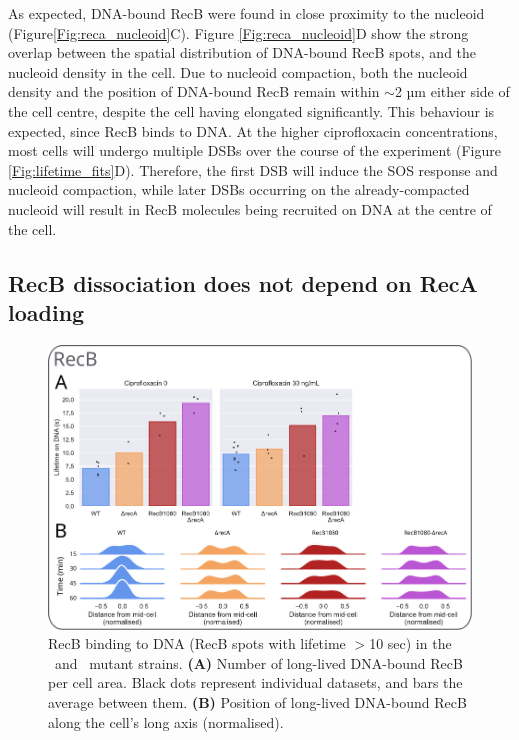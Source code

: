 As expected, DNA-bound RecB were found in close proximity to the nucleoid (Figure\ref{Fig:reca_nucleoid}C). Figure \ref{Fig:reca_nucleoid}D show the strong overlap between the spatial distribution of DNA-bound RecB spots, and the nucleoid density in the cell. Due to nucleoid compaction, both the nucleoid density and the position of DNA-bound RecB remain within $\sim$2 µm either side of the cell centre, despite the cell having elongated significantly. This behaviour is expected, since RecB binds to DNA. At the higher ciprofloxacin concentrations, most cells will undergo multiple DSBs over the course of the experiment (Figure \ref{Fig:lifetime_fits}D). Therefore, the first DSB will induce the SOS response and nucleoid compaction, while later DSBs occurring on the already-compacted nucleoid will result in RecB molecules being recruited on DNA at the centre of the cell.



\subsection*{RecB dissociation does not depend on RecA loading}

\begin{figure}[htbp]
    \centering
    \includegraphics[width=.8\textwidth]{Figures/Fig5_mutants.pdf}
    \caption{RecB binding to DNA (RecB spots with lifetime $>$10 sec) in the \dreca\ and \teneighty\ mutant strains. \textbf{(A)} Number of long-lived DNA-bound RecB per cell area. Black dots represent individual datasets, and bars the average between them. \textbf{(B)} Position of long-lived DNA-bound RecB along the cell's long axis (normalised).}
    \label{Fig:mutants}
\end{figure}

